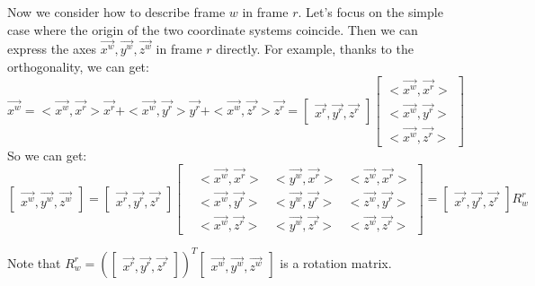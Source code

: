 \documentclass[
]{book}
\theoremstyle{definition}
\theoremstyle{definition}
\theoremstyle{definition}
\theoremstyle{definition}
\theoremstyle{remark}
\begin{document}
Now we consider how to describe frame \(w\) in frame \(r\). Let's focus on the simple case where the origin of the two coordinate systems coincide. Then we can express the axes \(\vec{x^w},\vec{y^w},\vec{z^w}\) in frame \(r\) directly. For example, thanks to the orthogonality, we can get:\[\vec{x^w} = <\vec{x^w},\vec{x^r}>\vec{x^r} +<\vec{x^w},\vec{y^r}>\vec{y^r} +  <\vec{x^w},\vec{z^r}>\vec{z^r} = \begin{bmatrix}
    \vec{x^r},\vec{y^r},\vec{z^r}\end{bmatrix}\begin{bmatrix} <\vec{x^w},\vec{x^r}>\\ <\vec{x^w},\vec{y^r}>\\<\vec{x^w},\vec{z^r}>
\end{bmatrix}\] So we can get:
\[\begin{bmatrix}
    \vec{x^w},\vec{y^w},\vec{z^w}
\end{bmatrix} = \begin{bmatrix}
    \vec{x^r},\vec{y^r},\vec{z^r}
\end{bmatrix}\begin{bmatrix}
    &<\vec{x^w},\vec{x^r}> &<\vec{y^w},\vec{x^r}> &<\vec{z^w},\vec{x^r}>\\
    &<\vec{x^w},\vec{y^r}> &<\vec{y^w},\vec{y^r}> &<\vec{z^w},\vec{y^r}>\\
    &<\vec{x^w},\vec{z^r}> &<\vec{y^w},\vec{z^r}> &<\vec{z^w},\vec{z^r}>
\end{bmatrix} = \begin{bmatrix}
    \vec{x^r},\vec{y^r},\vec{z^r}
\end{bmatrix}R^r_w\]

Note that \(R^r_w = (\begin{bmatrix}  \vec{x^r},\vec{y^r},\vec{z^r} \end{bmatrix})^T\begin{bmatrix}  \vec{x^w},\vec{y^w},\vec{z^w} \end{bmatrix}\) is a rotation matrix.
\end{document}
